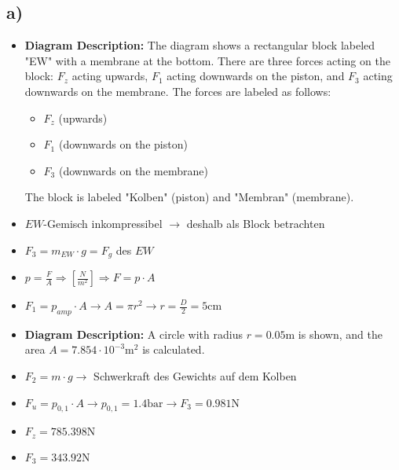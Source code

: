 

\subsection*{a)}

\begin{itemize}
    \item \textbf{Diagram Description:} The diagram shows a rectangular block labeled "EW" with a membrane at the bottom. There are three forces acting on the block: $F_z$ acting upwards, $F_1$ acting downwards on the piston, and $F_3$ acting downwards on the membrane. The forces are labeled as follows:
    \begin{itemize}
        \item $F_z$ (upwards)
        \item $F_1$ (downwards on the piston)
        \item $F_3$ (downwards on the membrane)
    \end{itemize}
    The block is labeled "Kolben" (piston) and "Membran" (membrane).
\end{itemize}

\begin{itemize}
    \item $EW$-Gemisch inkompressibel $\rightarrow$ deshalb als Block betrachten
    \item $F_3 = m_{EW} \cdot g = F_g$ des $EW$
    \item $p = \frac{F}{A} \Rightarrow \left[ \frac{N}{m^2} \right] \Rightarrow F = p \cdot A$
    \item $F_1 = p_{amp} \cdot A \rightarrow A = \pi r^2 \rightarrow r = \frac{D}{2} = 5 \text{cm}$
    \item \textbf{Diagram Description:} A circle with radius $r = 0.05 \text{m}$ is shown, and the area $A = 7.854 \cdot 10^{-3} \text{m}^2$ is calculated.
    \item $F_2 = m \cdot g \rightarrow$ Schwerkraft des Gewichts auf dem Kolben
    \item $F_u = p_{0,1} \cdot A \rightarrow p_{0,1} = 1.4 \text{bar} \rightarrow F_3 = 0.981 \text{N}$
    \item $F_z = 785.398 \text{N}$
    \item $F_3 = 343.92 \text{N}$
\end{itemize}